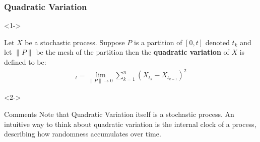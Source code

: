 \documentclass[10pt]{beamer}
\begin{document}
\begin{frame}[t]
  \frametitle{Quadratic Variation}
  \begin{onlyenv}<1->
    \begin{definition}
      Let $X$ be a stochastic process. Suppose $P$ is a partition of $[0,t]$ denoted $t_k$ and let $\lVert P \rVert$ be the mesh of the partition then the \textbf{quadratic variation} of $X$ is defined to be:
          \begin{align*}
            [X]_t = \lim\limits_{\lVert P \rVert \to 0} \displaystyle\sum_{k = 1}^{n}(X_{t_k} - X_{t_{k-1}})^2
          \end{align*}
    \end{definition}
  \end{onlyenv}
  \begin{onlyenv}<2->
    \begin{block}{Comments}
      Note that Quadratic Variation itself is a stochastic process. An intuitive way to think about quadratic variation is the internal clock of a process, describing how randomness accumulates over time.
    \end{block}
  \end{onlyenv}
\end{frame}
\end{document}
